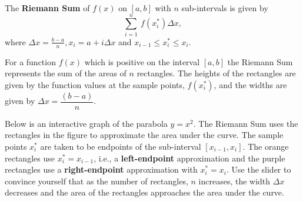 \documentclass[handout]{ximera}
\begin{document}

\begin{definition}
The \textbf{Riemann Sum} of $f(x)$ on $[a,b]$ with $n$ sub-intervals is given by 
\[\sum_{i = 1}^n \ f(x_i^*) \Delta x,\]
where $\Delta x = \frac{b-a}{n}, x_i = a + i\Delta x$ and $x_{i-1} \leq x_i^* \leq x_i$.  
\end{definition}

\begin{remark}
For a function $f(x)$ which is positive on the interval $[a,b]$
the Riemann Sum represents the sum of the areas of $n$ rectangles.  
The heights of the rectangles are given by the function values at the sample 
points, $f(x_i^*)$, and the widths are given by $\Delta x = \dfrac{(b-a)}{n}$.
\end{remark}


\begin{example}[example 4]
Below is an interactive graph of the parabola $y=x^2$.  
The Riemann Sum uses the rectangles in the figure to approximate the area under the curve.
The sample points $x_i^*$ are taken to be endpoints of the sub-interval $[x_{i-1}, x_i]$. 
The orange rectangles use $x_i^* = x_{i-1}$, i.e., 
a \textbf{left-endpoint} approximation and the purple rectangles 
use a \textbf{right-endpoint} approximation with $x_i^* = x_i$.
Use the slider to convince yourself that as the number of rectangles, $n$ increases, the 
width $\Delta x$ decreases and
the area of the rectangles approaches the area under the curve. 
\begin{onlineOnly}
  \begin{center}
  \end{center}
\end{onlineOnly}
\end{example}







\end{document}
